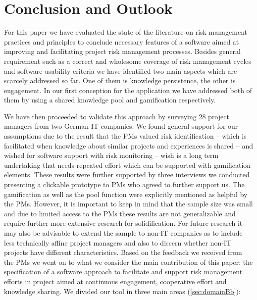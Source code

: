 \chapter{Conclusion and Outlook}
\label{ch:conclusionoutlookB}

For this paper we have evaluated the state of the literature on risk management practices and principles to conclude necessary features of a software aimed at improving and facilitating project risk management processes. Besides general requirement such as a correct and wholesome coverage of risk management cycles and software usability criteria we have identified two main aspects which are scarcely addressed so far. One of them is knowledge persistence, the other is engagement. In our first conception for the application we have addressed both of them by using a shared knowledge pool and gamification respectively.

We have then proceeded to validate this approach by surveying 28 project managers from two German IT companies. We found general support for our assumptions due to the result that the PMs valued risk identification – which is facilitated when knowledge about similar projects and experiences is shared – and wished for software support with risk monitoring – wish is a long term undertaking that needs repeated effort which can be supported with gamification elements. These results were further supported by three interviews we conducted presenting a clickable prototype to PMs who agreed to further support us. The gamification as well as the pool function were explicitly mentioned as helpful by the PMs. However, it is important to keep in mind that the sample size was small and due to limited access to the PMs these results are not generalizable and require further more extensive research for solidification. For future research it may also be advisable to extend the sample to non-IT companies as to include less technically affine project managers and also to discern whether non-IT projects have different characteristics.
Based on the feedback we received from the PMs we went on to what we consider the main contribution of this paper: the specification of a software approach to facilitate and support risk management efforts in project aimed at continuous engagement, cooperative effort and knowledge sharing. We divided our tool in three main areas (\ref{sec:domainBb}): 


